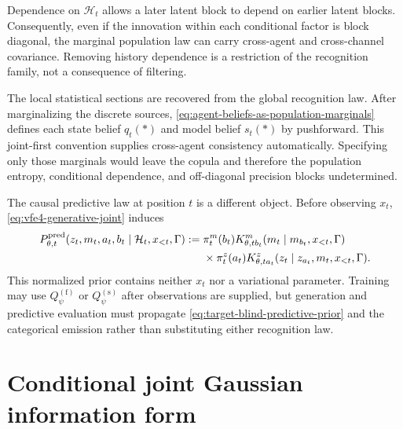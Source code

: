 Dependence on $\mathcal H_t$ allows a later latent block to depend on earlier latent blocks. Consequently, even if the innovation within each conditional factor is block diagonal, the marginal population law can carry cross-agent and cross-channel covariance. Removing history dependence is a restriction of the recognition family, not a consequence of filtering.

The local statistical sections are recovered from the global recognition law. After marginalizing the discrete sources, \cref{eq:agent-beliefs-as-population-marginals} defines each state belief $q_t(\ast)$ and model belief $s_t(\ast)$ by pushforward. This joint-first convention supplies cross-agent consistency automatically. Specifying only those marginals would leave the copula and therefore the population entropy, conditional dependence, and off-diagonal precision blocks undetermined.

The causal predictive law at position $t$ is a different object.  Before observing $x_t$, \cref{eq:vfe4-generative-joint} induces
\begin{equation}
\begin{aligned}
P_{\theta,t}^{\mathrm{pred}}
(z_t,m_t,a_t,b_t\mid\mathcal H_t,x_{<t},\Gamma)
:={}&\pi_t^m(b_t)
K^m_{\theta,tb_t}(m_t\mid m_{b_t},x_{<t},\Gamma)\\
&\times\pi_t^z(a_t)
K^z_{\theta,ta_t}(z_t\mid z_{a_t},m_t,x_{<t},\Gamma).
\end{aligned}
\label{eq:target-blind-predictive-prior}
\end{equation}
This normalized prior contains neither $x_t$ nor a variational parameter.  Training may use $Q_\psi^{(\mathrm f)}$ or $Q_\psi^{(\mathrm s)}$ after observations are supplied, but generation and predictive evaluation must propagate \cref{eq:target-blind-predictive-prior} and the categorical emission rather than substituting either recognition law.

\section{Conditional joint Gaussian information form}

